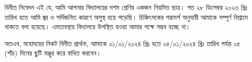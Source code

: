 \documentclass{../bdletter}
\begin{document}
\PrintLetterHeader

বিনীত নিবেদন এই যে, আমি আপনার বিদ্যালয়ের দশম শ্রেণির একজন নিয়মিত ছাত্র।
গত ২৮ ডিসেম্বর ২০২৩ খ্রিঃ তারিখ হতে আমি জ্বর ও সর্দিজনিত কারণে অসুস্থ হয়ে
পড়েছি। চিকিৎসকের পরামর্শ অনুযায়ী আমাকে সম্পূর্ণ বিশ্রামে থাকতে বলা হয়েছে।
এমতাবস্থায় বিদ্যালয়ে উপস্থিত হওয়া আমার পক্ষে সম্ভব হচ্ছে না।

অতএব, মহোদয়ের নিকট বিনীত প্রার্থনা, আমাকে ০১/০১/২০২৪ খ্রিঃ হতে ০৫/০১/২০২৪
খ্রিঃ তারিখ পর্যন্ত ০৫ (পাঁচ) দিনের ছুটি মঞ্জুর করে বাধিত করবেন।

\PrintLetterFooter
\end{document}
